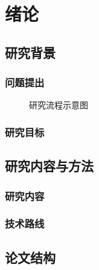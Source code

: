 \chapter{绪论}

\section{研究背景}
\placeholderpar{}

\subsection{问题提出}
\placeholderpar

\begin{figure}[htbp]
  \centering
  \fbox{\rule{0pt}{5cm}\rule{0.78\textwidth}{0pt}}
  \caption{研究流程示意图}
\end{figure}

\subsection{研究目标}
\placeholderpar

\section{研究内容与方法}
\placeholderpar

\subsection{研究内容}
\placeholderpar

\subsection{技术路线}
\placeholderpar

\section{论文结构}
\placeholderpar
